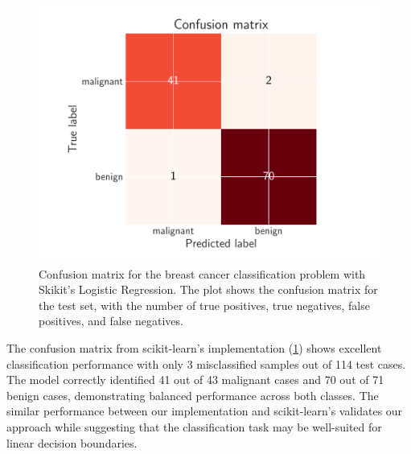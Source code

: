 \begin{figure}[ht!]
    \includegraphics[width =.45\textwidth]{../figs/confusion_matrix.pdf}
    \caption{Confusion matrix for the breast cancer classification problem with Skikit's Logistic Regression. The plot shows the confusion matrix for the test set, with the number of true positives, true negatives, false positives, and false negatives.}
    \label{fig:confusion_matrix}
\end{figure}

The confusion matrix from scikit-learn's implementation (\cref{fig:confusion_matrix}) shows excellent classification performance with only 3 misclassified samples out of 114 test cases. The model correctly identified 41 out of 43 malignant cases and 70 out of 71 benign cases, demonstrating balanced performance across both classes. The similar performance between our implementation and scikit-learn's validates our approach while suggesting that the classification task may be well-suited for linear decision boundaries.

\clearpage

